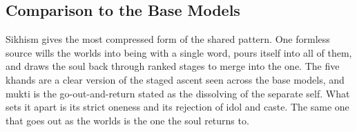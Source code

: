 \subsection{Comparison to the Base Models}

Sikhism gives the most compressed form of the shared pattern. One formless
source wills the worlds into being with a single word, pours itself into all of
them, and draws the soul back through ranked stages to merge into the one. The
five khands are a clear version of the staged ascent seen across the base
models, and mukti is the go-out-and-return stated as the dissolving of the
separate self. What sets it apart is its strict oneness and its rejection of
idol and caste. The same one that goes out as the worlds is the one the soul
returns to.
